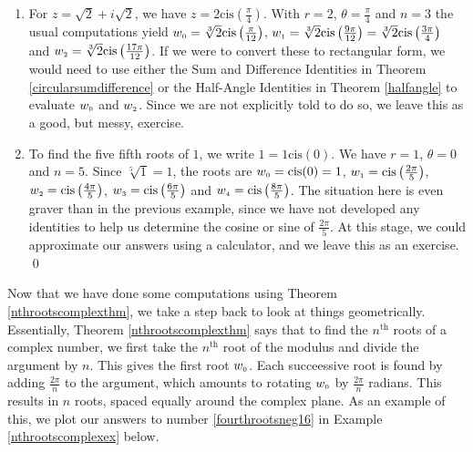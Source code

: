 \begin{ex}
\begin{enumerate}
\item  For $z = \sqrt{2} + i \sqrt{2}$, we have $z = 2\text{cis}\left(\frac{\pi}{4}\right)$.  With $r = 2$, $\theta = \frac{\pi}{4}$ and $n =3$ the usual computations yield $w_{\text{\tiny$0$}} = \sqrt[3]{2} \text{cis}\left(\frac{\pi}{12}\right)$,  $w_{\text{\tiny$1$}} = \sqrt[3]{2} \text{cis}\left(\frac{9\pi}{12}\right) = \sqrt[3]{2} \text{cis}\left(\frac{3\pi}{4}\right) $ and  $w_{\text{\tiny$2$}} = \sqrt[3]{2} \text{cis}\left(\frac{17\pi}{12}\right)$.  If we were to  convert these to rectangular form, we would need to use either the Sum and Difference Identities in Theorem \ref{circularsumdifference} or the Half-Angle Identities in Theorem \ref{halfangle} to evaluate $w_{\text{\tiny$0$}}$ and  $w_{\text{\tiny$2$}}$.  Since we are not explicitly told to do so, we leave this as a good, but messy, exercise.

\item  To find the five fifth roots of $1$, we write $1 = 1 \text{cis}(0)$.  We have $r = 1$, $\theta = 0$ and $n = 5$. Since $\sqrt[5]{1} = 1$, the roots are  $w_{\text{\tiny$0$}} = \text{cis}(0) = 1$, $w_{\text{\tiny$1$}} = \text{cis}\left(\frac{2\pi}{5}\right)$, $w_{\text{\tiny$2$}} = \text{cis}\left(\frac{4\pi}{5}\right)$, $w_{\text{\tiny$3$}} = \text{cis}\left(\frac{6\pi}{5}\right)$ and $w_{\text{\tiny$4$}} = \text{cis}\left(\frac{8\pi}{5}\right)$.  The situation here is even graver than in the previous example, since we have not developed any identities to help us determine the cosine or sine of $\frac{2\pi}{5}$.  At this stage, we could approximate our answers using a calculator, and we leave this as an exercise. \qed

\end{enumerate}

\end{ex}

Now that we have done some computations using  Theorem \ref{nthrootscomplexthm}, we take a step back to look at things geometrically.  Essentially,  Theorem \ref{nthrootscomplexthm} says that to find the $n^{\text{th}}$ roots of a complex number,  we first take the $n^{\text{th}}$ root of the modulus and divide the argument by $n$.  This gives the first root  $w_{\text{\tiny$0$}}$. Each succeessive root is found by adding  $\frac{2\pi}{n}$ to the argument, which amounts to rotating $w_{\text{\tiny$0$}}$ by $\frac{2\pi}{n}$ radians.  This results in $n$ roots, spaced equally around the complex plane.  As an example of this, we plot our answers to number \ref{fourthrootsneg16} in Example \ref{nthrootscomplexex} below.

